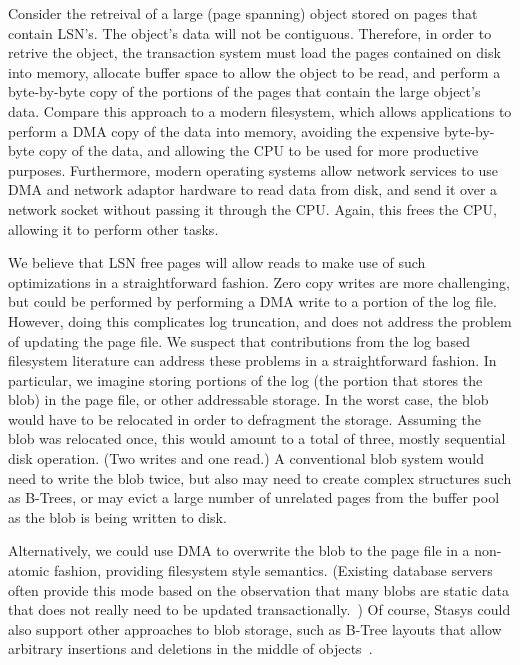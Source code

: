 \documentclass[letterpaper,twocolumn,10pt]{article}
\newcommand{\yad}{Stasys\xspace}
\begin{document}
Consider the retreival of a large (page spanning) object stored on
pages that contain LSN's.  The object's data will not be contiguous.
Therefore, in order to retrive the object, the transaction system must
load the pages contained on disk into memory, allocate buffer space to
allow the object to be read, and perform a byte-by-byte copy of the
portions of the pages that contain the large object's data.  Compare
this approach to a modern filesystem, which allows applications to
perform a DMA copy of the data into memory, avoiding the expensive
byte-by-byte copy of the data, and allowing the CPU to be used for
more productive purposes.  Furthermore, modern operating systems allow
network services to use DMA and network adaptor hardware to read data
from disk, and send it over a network socket without passing it
through the CPU.  Again, this frees the CPU, allowing it to perform
other tasks.

We believe that LSN free pages will allow reads to make use of such
optimizations in a straightforward fashion.  Zero copy writes are more challenging, but could be
performed by performing a DMA write to a portion of the log file.
However, doing this complicates log truncation, and does not address
the problem of updating the page file.  We suspect that contributions
from the log based filesystem literature can address these problems in
a straightforward fashion.  In particular, we imagine storing 
portions of the log (the portion that stores the blob) in the 
page file, or other addressable storage.  In the worst case, 
the blob would have to be relocated in order to defragment the 
storage.  Assuming the blob was relocated once, this would amount 
to a total of three, mostly sequential disk operation.  (Two 
writes and one read.)  A conventional blob system would need 
to write the blob twice, but also may need to create complex 
structures such as B-Trees, or may evict a large number of 
unrelated pages from the buffer pool as the blob is being written 
to disk.  

Alternatively, we could use DMA to overwrite the blob to the page file
in a non-atomic fashion, providing filesystem style semantics.
(Existing database servers often provide this mode based on the
observation that many blobs are static data that does not really need
to be updated transactionally.~\cite{sqlserver}) Of course, \yad could
also support other approaches to blob storage, such as B-Tree layouts
that allow arbitrary insertions and deletions in the middle of
objects~\cite{esm}.
\end{document}

